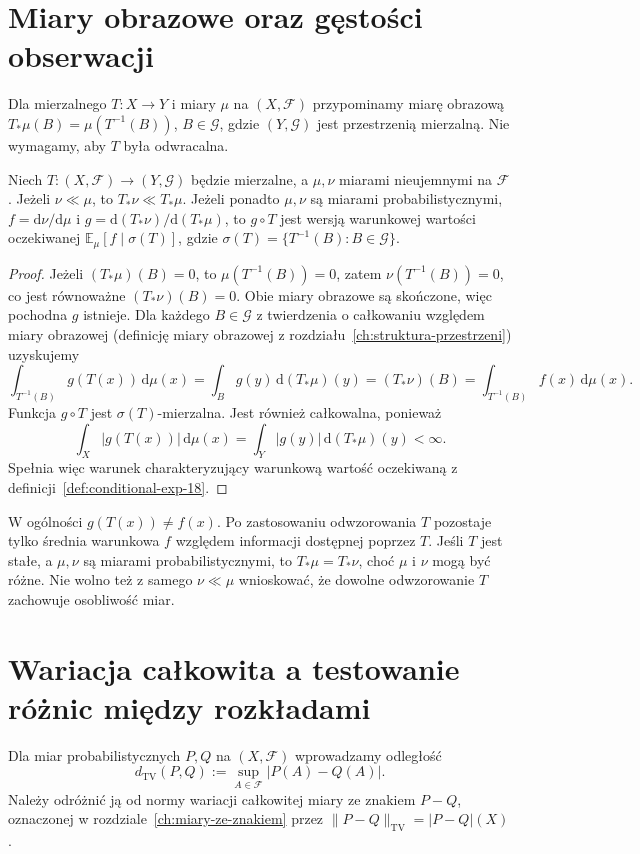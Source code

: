 \section{Miary obrazowe oraz gęstości obserwacji}
Dla mierzalnego $T:X\to Y$ i miary $\mu$ na $(X,\mathcal F)$
przypominamy miarę obrazową
$T_*\mu(B)=\mu(T^{-1}(B))$, $B\in\mathcal G$,
gdzie $(Y,\mathcal G)$ jest przestrzenią mierzalną.
Nie wymagamy, aby $T$ była odwracalna.

\begin{twierdzenie}
\label{thm:image-ac-19}
Niech $T:(X,\mathcal F)\to(Y,\mathcal G)$ będzie mierzalne,
a $\mu,\nu$ miarami nieujemnymi na $\mathcal F$.
Jeżeli $\nu\ll\mu$, to $T_*\nu\ll T_*\mu$.
Jeżeli ponadto $\mu,\nu$ są miarami probabilistycznymi,
$f=\mathrm d\nu/\mathrm d\mu$ i
$g=\mathrm d(T_*\nu)/\mathrm d(T_*\mu)$,
to $g\circ T$ jest wersją warunkowej wartości oczekiwanej
$\mathbb E_\mu[f\mid\sigma(T)]$, gdzie
$\sigma(T)=\{T^{-1}(B):B\in\mathcal G\}$.
\end{twierdzenie}
\begin{proof}
Jeżeli $(T_*\mu)(B)=0$, to $\mu(T^{-1}(B))=0$,
zatem $\nu(T^{-1}(B))=0$, co jest równoważne
$(T_*\nu)(B)=0$. Obie miary obrazowe są skończone,
więc pochodna $g$ istnieje. Dla każdego $B\in\mathcal G$
z twierdzenia o całkowaniu względem miary obrazowej
(definicję miary obrazowej z rozdziału~\ref{ch:struktura-przestrzeni})
uzyskujemy
\[
\int_{T^{-1}(B)}g(T(x))\,\mathrm d\mu(x)
=\int_Bg(y)\,\mathrm d(T_*\mu)(y)
=(T_*\nu)(B)
=\int_{T^{-1}(B)}f(x)\,\mathrm d\mu(x).
\]
Funkcja $g\circ T$ jest $\sigma(T)$-mierzalna. Jest również
całkowalna, ponieważ
\[
\int_X|g(T(x))|\,\mathrm d\mu(x)
=\int_Y|g(y)|\,\mathrm d(T_*\mu)(y)<\infty.
\]
Spełnia więc warunek charakteryzujący warunkową wartość oczekiwaną
z definicji~\ref{def:conditional-exp-18}.
\end{proof}

\begin{uwaga}
W ogólności $g(T(x))\neq f(x)$. Po zastosowaniu
odwzorowania $T$ pozostaje tylko średnia warunkowa $f$
względem informacji dostępnej poprzez $T$. Jeśli $T$
jest stałe, a $\mu,\nu$ są miarami probabilistycznymi,
to $T_*\mu=T_*\nu$, choć $\mu$ i $\nu$ mogą być różne.
Nie wolno też z samego $\nu\ll\mu$ wnioskować, że dowolne
odwzorowanie $T$ zachowuje osobliwość miar.
\end{uwaga}

\section{Wariacja całkowita a testowanie różnic między rozkładami}
Dla miar probabilistycznych $P,Q$ na $(X,\mathcal F)$
wprowadzamy odległość
\begin{equation}\label{eq:tv-prob-19}
d_{\mathrm{TV}}(P,Q):=\sup_{A\in\mathcal F}|P(A)-Q(A)|.
\end{equation}
Należy odróżnić ją od normy wariacji całkowitej miary ze znakiem
$P-Q$, oznaczonej w rozdziale~\ref{ch:miary-ze-znakiem} przez
$\|P-Q\|_{\mathrm{TV}}=|P-Q|(X)$.

